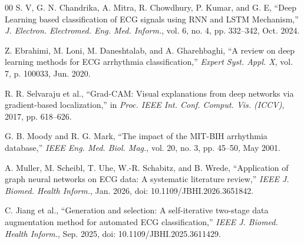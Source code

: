 \documentclass[conference]{IEEEtran}
\begin{document}
\begin{thebibliography}{00}
S. V, G. N. Chandrika, A. Mitra, R. Chowdhury, P. Kumar, and G. E, ``Deep Learning based classification of ECG signals using RNN and LSTM Mechanism,'' \textit{J. Electron. Electromed. Eng. Med. Inform.}, vol. 6, no. 4, pp. 332--342, Oct. 2024.

Z. Ebrahimi, M. Loni, M. Daneshtalab, and A. Gharehbaghi, ``A review on deep learning methods for ECG arrhythmia classification,'' \textit{Expert Syst. Appl. X}, vol. 7, p. 100033, Jun. 2020.

R. R. Selvaraju et al., ``Grad-CAM: Visual explanations from deep networks via gradient-based localization,'' in \textit{Proc. IEEE Int. Conf. Comput. Vis. (ICCV)}, 2017, pp. 618--626.

G. B. Moody and R. G. Mark, ``The impact of the MIT-BIH arrhythmia database,'' \textit{IEEE Eng. Med. Biol. Mag.}, vol. 20, no. 3, pp. 45--50, May 2001.

A. Muller, M. Scheibl, T. Uhe, W.-R. Schabitz, and B. Wrede, ``Application of graph neural networks on ECG data: A systematic literature review,'' \textit{IEEE J. Biomed. Health Inform.}, Jan. 2026, doi: 10.1109/JBHI.2026.3651842.

C. Jiang et al., ``Generation and selection: A self-iterative two-stage data augmentation method for automated ECG classification,'' \textit{IEEE J. Biomed. Health Inform.}, Sep. 2025, doi: 10.1109/JBHI.2025.3611429.

\end{thebibliography}
\end{document}
